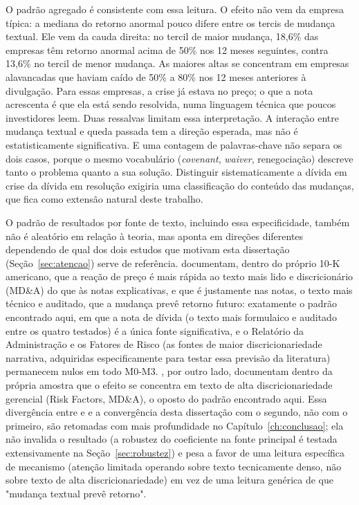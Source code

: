 \documentclass[a4paper,12pt]{report}
\begin{document}
O padrão agregado é consistente com essa leitura. O efeito não vem da empresa típica: a mediana do retorno anormal pouco difere entre os tercis de mudança textual. Ele vem da cauda direita: no tercil de maior mudança, 18,6\% das empresas têm retorno anormal acima de 50\% nos 12 meses seguintes, contra 13,6\% no tercil de menor mudança. As maiores altas se concentram em empresas alavancadas que haviam caído de 50\% a 80\% nos 12 meses anteriores à divulgação. Para essas empresas, a crise já estava no preço; o que a nota acrescenta é que ela está sendo resolvida, numa linguagem técnica que poucos investidores leem. Duas ressalvas limitam essa interpretação. A interação entre mudança textual e queda passada tem a direção esperada, mas não é estatisticamente significativa. E uma contagem de palavras-chave não separa os dois casos, porque o mesmo vocabulário (\textit{covenant}, \textit{waiver}, renegociação) descreve tanto o problema quanto a sua solução. Distinguir sistematicamente a dívida em crise da dívida em resolução exigiria uma classificação do conteúdo das mudanças, que fica como extensão natural deste trabalho.

O padrão de resultados por fonte de texto, incluindo essa especificidade, também não é aleatório em relação à teoria, mas aponta em direções diferentes dependendo de qual dos dois estudos que motivam esta dissertação (Seção~\ref{sec:atencao}) serve de referência.  documentam, dentro do próprio 10-K americano, que a reação de preço é mais rápida ao texto mais lido e discricionário (MD\&A) do que às notas explicativas, e que é justamente nas notas, o texto mais técnico e auditado, que a mudança prevê retorno futuro: exatamente o padrão encontrado aqui, em que a nota de dívida (o texto mais formulaico e auditado entre os quatro testados) é a única fonte significativa, e o Relatório da Administração e os Fatores de Risco (as fontes de maior discricionariedade narrativa, adquiridas especificamente para testar essa previsão da literatura) permanecem nulos em todo M0-M3. , por outro lado, documentam dentro da própria amostra que o efeito se concentra em texto de alta discricionariedade gerencial (Risk Factors, MD\&A), o oposto do padrão encontrado aqui. Essa divergência entre  e  e a convergência desta dissertação com o segundo, não com o primeiro, são retomadas com mais profundidade no Capítulo~\ref{ch:conclusao}; ela não invalida o resultado (a robustez do coeficiente na fonte principal é testada extensivamente na Seção~\ref{sec:robustez}) e pesa a favor de uma leitura específica de mecanismo (atenção limitada operando sobre texto tecnicamente denso, não sobre texto de alta discricionariedade) em vez de uma leitura genérica de que "mudança textual prevê retorno".
\end{document}
